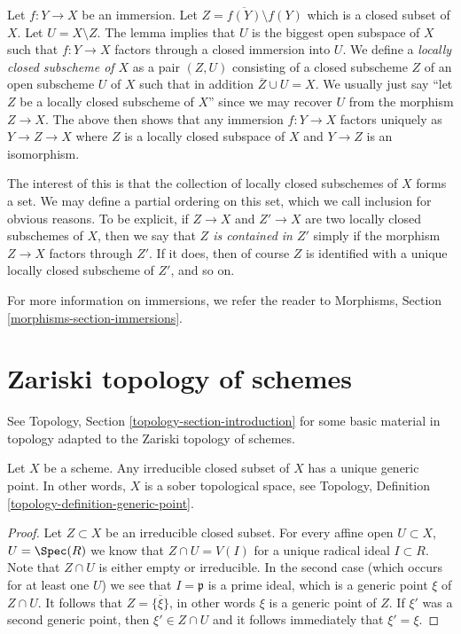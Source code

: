 \noindent
Let $f : Y \to X$ be an immersion.
Let $Z = \overline{f(Y)} \setminus f(Y)$ which is a closed subset of $X$.
Let $U = X \setminus Z$.
The lemma implies that $U$ is the biggest open subspace of $X$
such that $f : Y \to X$ factors through a closed immersion into $U$.
We define a {\it locally closed subscheme of $X$} as a pair
$(Z, U)$ consisting of a closed subscheme $Z$ of an open subscheme $U$
of $X$ such that in addition $\overline{Z} \cup U = X$. We usually
just say ``let $Z$ be a locally closed subscheme of $X$'' since we may
recover $U$ from the morphism $Z \to X$. The above
then shows that any immersion $f : Y \to X$ factors uniquely
as $Y \to Z \to X$ where $Z$ is a locally closed subspace of $X$
and $Y \to Z$ is an isomorphism.

\medskip\noindent
The interest of this is that the collection of locally closed subschemes
of $X$ forms a set. We may define a partial ordering on this set,
which we call inclusion for obvious reasons. To be explicit, if
$Z \to X$ and $Z' \to X$ are two locally closed subschemes of $X$, then
we say that {\it $Z$ is contained in $Z'$} simply if the morphism
$Z \to X$ factors through $Z'$. If it does, then of course $Z$ is identified
with a unique locally closed subscheme of $Z'$, and so on.

\medskip\noindent
For more information on immersions, we refer the reader to
Morphisms, Section \ref{morphisms-section-immersions}.










\section{Zariski topology of schemes}
\label{section-topology}

\noindent
See Topology, Section \ref{topology-section-introduction}
for some basic material in topology adapted to the Zariski
topology of schemes.

\begin{lemma}
\label{lemma-scheme-sober}
Let $X$ be a scheme.
Any irreducible closed subset of $X$ has a unique generic point.
In other words, $X$ is a sober topological space, see
Topology, Definition \ref{topology-definition-generic-point}.
\end{lemma}

\begin{proof}
Let $Z \subset X$ be an irreducible closed subset.
For every affine open $U \subset X$, $U = \Spec(R)$
we know that $Z \cap U = V(I)$ for a unique
radical ideal $I \subset R$. Note that $Z \cap U$ is either
empty or irreducible. In the second case (which occurs
for at least one $U$) we see that $I = \mathfrak p$
is a prime ideal, which is a generic point $\xi$ of $Z \cap U$.
It follows that $Z = \overline{\{\xi\}}$, in other words
$\xi$ is a generic point of $Z$. If $\xi'$ was a second
generic point, then $\xi' \in Z \cap U$ and it follows
immediately that $\xi' = \xi$.
\end{proof}

